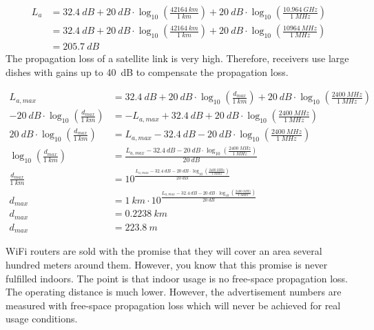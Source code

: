 \begin{solution}
\begin{tasks}
		\task
		\begin{equation*}
			\begin{split}
				L_a &= \SI{32.4}{dB} + \SI{20}{dB} \cdot \log_{10}\left(\frac{\SI{42164}{km}}{\SI{1}{km}}\right) + \SI{20}{dB} \cdot \log_{10}\left(\frac{\SI{10.964}{GHz}}{\SI{1}{MHz}}\right) \\
				 &= \SI{32.4}{dB} + \SI{20}{dB} \cdot \log_{10}\left(\frac{\SI{42164}{km}}{\SI{1}{km}}\right) + \SI{20}{dB} \cdot \log_{10}\left(\frac{\SI{10964}{MHz}}{\SI{1}{MHz}}\right) \\
				 &= \SI{205.7}{dB}
			\end{split}
		\end{equation*}
		The propagation loss of a satellite link is very high. Therefore, receivers use large dishes with gains up to \SI{40}{dB} to compensate the propagation loss.
		
		\task
		\begin{equation*}
			\begin{split}
				L_{a,max} &= \SI{32.4}{dB} + \SI{20}{dB} \cdot \log_{10}\left(\frac{d_{max}}{\SI{1}{km}}\right) + \SI{20}{dB} \cdot \log_{10}\left(\frac{\SI{2400}{MHz}}{\SI{1}{MHz}}\right) \\
				- \SI{20}{dB} \cdot \log_{10}\left(\frac{d_{max}}{\SI{1}{km}}\right) &= - L_{a,max} + \SI{32.4}{dB} + \SI{20}{dB} \cdot \log_{10}\left(\frac{\SI{2400}{MHz}}{\SI{1}{MHz}}\right) \\
				\SI{20}{dB} \cdot \log_{10}\left(\frac{d_{max}}{\SI{1}{km}}\right) &= L_{a,max} - \SI{32.4}{dB} - \SI{20}{dB} \cdot \log_{10}\left(\frac{\SI{2400}{MHz}}{\SI{1}{MHz}}\right) \\
				\log_{10}\left(\frac{d_{max}}{\SI{1}{km}}\right) &= \frac{L_{a,max} - \SI{32.4}{dB} - \SI{20}{dB} \cdot \log_{10}\left(\frac{\SI{2400}{MHz}}{\SI{1}{MHz}}\right)}{\SI{20}{dB}} \\
				\frac{d_{max}}{\SI{1}{km}} &= 10^{\frac{L_{a,max} - \SI{32.4}{dB} - \SI{20}{dB} \cdot \log_{10}\left(\frac{\SI{2400}{MHz}}{\SI{1}{MHz}}\right)}{\SI{20}{dB}}} \\
				d_{max} &= \SI{1}{km} \cdot 10^{\frac{L_{a,max} - \SI{32.4}{dB} - \SI{20}{dB} \cdot \log_{10}\left(\frac{\SI{2400}{MHz}}{\SI{1}{MHz}}\right)}{\SI{20}{dB}}} \\
				d_{max} &= \SI{0.2238}{km} \\
				d_{max} &= \SI{223.8}{m}
			\end{split}
		\end{equation*}
		
		WiFi routers are sold with the promise that they will cover an area several hundred meters around them. However, you know that this promise is never fulfilled indoors. The point is that indoor usage is no free-space propagation loss. The operating distance is much lower. However, the advertisement numbers are measured with free-space propagation loss which will never be achieved for real usage conditions.
	\end{tasks}
\end{solution}

